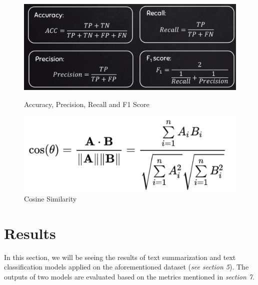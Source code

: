 \documentclass[a4paper,4pt]{article}
\begin{document}
\begin{center}
    \begin{figure}[h]
        \begin{minipage}{.5\textwidth}
            \includegraphics[scale=0.18]{images/evaluation_metrics_for_classification.png}
            \caption{Accuracy, Precision, Recall and F1 Score}
            \label{fig:aprf}
        \end{minipage}
        \begin{minipage}{.6\textwidth}
            \centering
            \includegraphics[scale=0.15]{images/cosine_similarity.png}
            \caption{Cosine Similarity}
            \label{fig:cosinesim}
        \end{minipage}
    \end{figure} 
\end{center}

\section{Results}
In this section, we will be seeing the results of text summarization and text classification models applied on the aforementioned
dataset (\textit{see section 5}). The outputs of two models are evaluated based on the metrics mentioned in \textit{section 7}.
\end{document}
